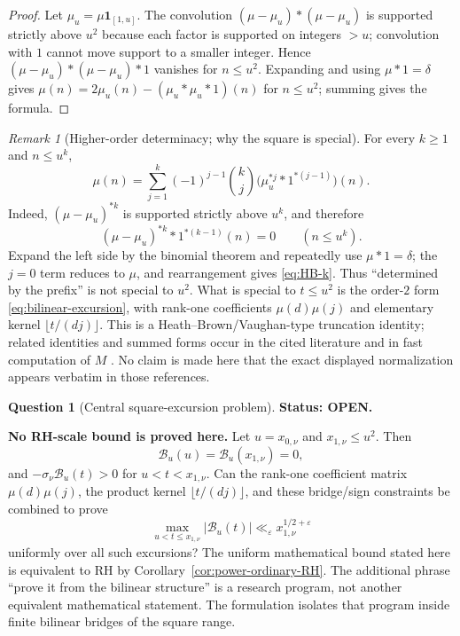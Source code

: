 \documentclass[11pt]{amsart}
\numberwithin{equation}{section}
\theoremstyle{plain}
\theoremstyle{definition}
\newtheorem{question}[theorem]{Question}
\theoremstyle{remark}
\newtheorem{remark}[theorem]{Remark}
\begin{document}
\begin{proof}
Let $\mu_u=\mu\mathbf1_{[1,u]}$. The convolution $(\mu-\mu_u)*(\mu-\mu_u)$ is supported strictly above
$u^2$ because each factor is supported on integers $>u$; convolution with
$1$ cannot move support to a smaller integer.  Hence
$(\mu-\mu_u)*(\mu-\mu_u)*1$ vanishes for $n\le u^2$. Expanding and
using $\mu*1=\delta$ gives
$\mu(n)=2\mu_u(n)-(\mu_u*\mu_u*1)(n)$ for $n\le u^2$; summing gives the
formula.
\end{proof}

\begin{remark}[Higher-order determinacy; why the square is special]
\label{rem:prefix-k}
For every $k\ge1$ and $n\le u^k$,
\begin{equation}
\label{eq:HB-k}
\mu(n)=\sum_{j=1}^{k}(-1)^{j-1}\binom{k}{j}
\bigl(\mu_u^{*j}*1^{*(j-1)}\bigr)(n).
\end{equation}
Indeed, $(\mu-\mu_u)^{*k}$ is supported strictly above $u^k$, and therefore
\[
(\mu-\mu_u)^{*k}*1^{*(k-1)}(n)=0\qquad(n\le u^k).
\]
Expand the left side by the binomial theorem and repeatedly use
$\mu*1=\delta$; the $j=0$ term reduces to $\mu$, and rearrangement gives
\eqref{eq:HB-k}. Thus ``determined by the prefix'' is not special to $u^2$. What is special
to $t\le u^2$ is the order-$2$ form \eqref{eq:bilinear-excursion}, with
rank-one coefficients $\mu(d)\mu(j)$ and elementary kernel
$\lfloor t/(dj)\rfloor$. This is a Heath--Brown/Vaughan-type truncation identity; related identities
and summed forms occur in the cited literature and in fast computation of
$M$ \cite{HB82,HT23}.  No claim is made here that the exact displayed
normalization appears verbatim in those references.
\end{remark}

\begin{question}[Central square-excursion problem]
\label{q:excursion-constraint}
\textbf{Status: OPEN.}\par\noindent\textbf{No RH-scale bound is proved here.}
Let $u=x_{0,\nu}$ and $x_{1,\nu}\le u^2$. Then
\[
\mathcal B_u(u)=\mathcal B_u(x_{1,\nu})=0,
\]
and $-\sigma_\nu \mathcal B_u(t)>0$ for
$u<t<x_{1,\nu}$. Can the rank-one coefficient matrix $\mu(d)\mu(j)$, the
product kernel $\lfloor t/(dj)\rfloor$, and these bridge/sign constraints be
combined to prove
\[
\max_{u<t\le x_{1,\nu}}|\mathcal B_u(t)|
\ll_\varepsilon x_{1,\nu}^{1/2+\varepsilon}
\]
uniformly over all such excursions? The uniform mathematical bound stated here is equivalent to RH by
Corollary~\ref{cor:power-ordinary-RH}.  The additional phrase ``prove it from
the bilinear structure'' is a research program, not another equivalent
mathematical statement.  The formulation isolates that program inside
finite bilinear bridges of the square range.
\end{question}
\end{document}
